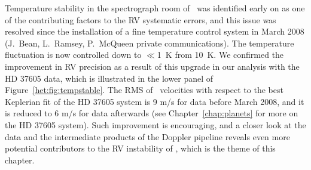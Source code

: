 Temperature stability in the spectrograph room of \hrs\ was identified
early on as one of the contributing factors to the RV systematic
errors, and this issue was resolved since the installation of a fine
temperature control system in March 2008 (J.~Bean, L.~Ramsey,
P.~McQueen private communications). The temperature fluctuation is now
controlled down to $\ll$1~K from 10~K. We confirmed the improvement in
RV precision as a result of this upgrade in our analysis with the HD
37605 data, which is illustrated in the lower panel of
Figure~\ref{het:fig:tempstable}. The RMS of \hrs\ velocities with
respect to the best Keplerian fit of the HD 37605 system is 9 m/s for
data before March 2008, and it is reduced to 6 m/s for data afterwards
(see Chapter~\ref{chap:planets} for more on the HD 37605 system). Such
improvement is encouraging, and a closer look at the data and the
intermediate products of the Doppler pipeline reveals even more
potential contributors to the RV instability of \hrs, which is the
theme of this chapter.


